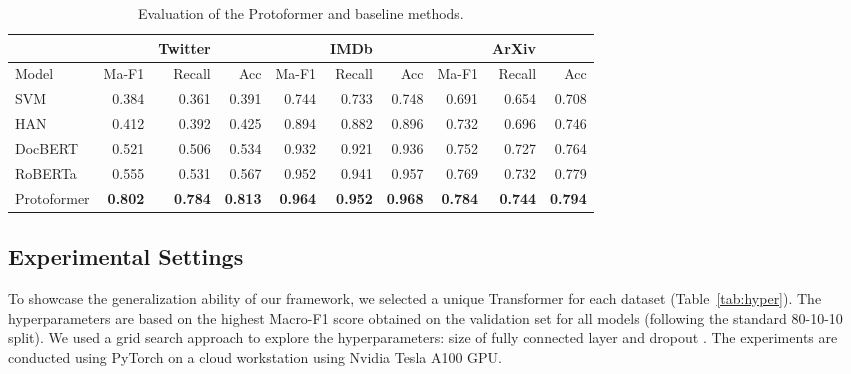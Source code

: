 \documentclass[letterpaper]{article} \usepackage{aaai22}  \usepackage{times}  \usepackage{helvet}  \usepackage{courier}  \usepackage{amsmath,amssymb}
\begin{document}
\begin{table}[!t]
 \centering
\caption{Evaluation of the Protoformer and baseline methods. }

\begin{tabular}{l|rrr|rrr|rrr}

\hline
\hline
 & & Twitter & & & IMDb & & & ArXiv & \\
\hline
Model & Ma-F1 & Recall & Acc & Ma-F1 & Recall & Acc & Ma-F1 & Recall & Acc\\
 \hline SVM~\cite{svm2003} & 0.384 & 0.361 & 0.391 & 0.744 & 0.733 & 0.748 & 0.691 & 0.654 & 0.708 \\
HAN~\cite{yang2016hierarchical} & 0.412 & 0.392 & 0.425 & 0.894 &0.882 & 0.896 & 0.732 & 0.696 & 0.746 \\
DocBERT~\cite{adhikari2019docbert} & 0.521 & 0.506 & 0.534 & 0.932&0.921&0.936 &0.752&0.727&0.764 \\
RoBERTa~\cite{liu2019roberta} & 0.555 & 0.531& 0.567 & 0.952 &0.941 & 0.957 &0.769&0.732&0.779\\
Protoformer & \textbf{0.802} & \textbf{0.784}& \textbf{0.813} & \textbf{0.964} &\textbf{0.952}&\textbf{0.968} & \textbf{0.784} & \textbf{0.744} & \textbf{0.794}\\
\hline
\hline
\end{tabular}

\label{tab:results}
\end{table}

\subsection{Experimental Settings}
To showcase the generalization ability of our framework, we selected a unique Transformer for each dataset (Table~\ref{tab:hyper}).
The hyperparameters are based on the highest Macro-F1 score obtained on the validation set for all models (following the standard 80-10-10 split). We used a grid search approach to explore the hyperparameters: size of fully connected layer   and dropout . 
The experiments are conducted using PyTorch on a cloud workstation using Nvidia Tesla A100 GPU.
\end{document}
